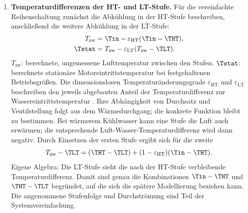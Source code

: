 \begin{enumerate}
  \item \textbf{Temperaturdifferenzen der HT- und LT-Stufe.}
    Für die vereinfachte Reihenschaltung zunächst die Abkühlung in der
    HT-Stufe beschreiben, anschließend die weitere Abkühlung in der
    LT-Stufe:
    \begin{equation}
      \label{eq.grundlagen.basic.stufen}
      \begin{aligned}
        T_{\mathrm{zw}}&=\Tin-\varepsilon_{\mathrm{HT}}
                                   (\Tin-\THT),\\
        \Tstat&=T_{\mathrm{zw}}-\varepsilon_{\mathrm{LT}}
                                   (T_{\mathrm{zw}}-\TLT).
      \end{aligned}
    \end{equation}
    $T_{\mathrm{zw}}$: berechnete, ungemessene Lufttemperatur zwischen
    den Stufen. $\Tstat$: berechnete stationäre Motoreintrittstemperatur
    bei festgehaltenen Betriebsgrößen. Die dimensionslosen
    Temperaturänderungsgrade $\varepsilon_{\mathrm{HT}}$ und
    $\varepsilon_{\mathrm{LT}}$ beschreiben den jeweils abgebauten
    Anteil der Temperaturdifferenz zur Wassereintrittstemperatur
    \cite[S.~257, Gl.~12.8]{pucherLadeluftkuehlungUndLadeluftkuehler2012}.
    Ihre Abhängigkeit von Durchsatz und Ventilstellung folgt aus dem
    Wärmedurchgang; die konkrete Funktion bleibt zu bestimmen.
    Bei wärmerem Kühlwasser kann eine Stufe die Luft auch erwärmen;
    die entsprechende Luft-Wasser-Temperaturdifferenz wird dann negativ.
    Durch Einsetzen der ersten Stufe ergibt sich für die zweite
    \begin{equation}
      \label{eq.grundlagen.basic.ltspanne}
      T_{\mathrm{zw}}-\TLT
       =(\THT-\TLT)+(1-\varepsilon_{\mathrm{HT}})(\Tin-\THT).
    \end{equation}
    Eigene Algebra: Die LT-Stufe sieht die nach der HT-Stufe verbleibende
    Temperaturdifferenz. Damit sind genau die Kombinationen
    $\Tin-\THT$ und $\THT-\TLT$ begründet, auf die sich die spätere
    Modellierung beziehen kann. Die angenommene Stufenfolge und
    Durchströmung sind Teil der Systemvereinfachung.


\end{enumerate}
